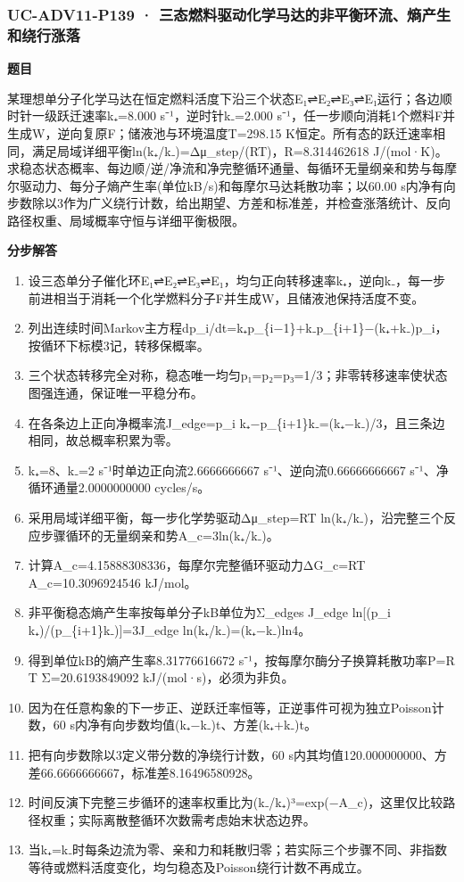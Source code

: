 \documentclass[UTF8,11pt,a4paper]{ctexart}
\begin{document}
\subsubsection*{UC-ADV11-P139 · 三态燃料驱动化学马达的非平衡环流、熵产生和绕行涨落}
\noindent\textbf{题目}\par
某理想单分子化学马达在恒定燃料活度下沿三个状态E₁⇌E₂⇌E₃⇌E₁运行；各边顺时针一级跃迁速率k₊=8.000 s⁻¹，逆时针k₋=2.000 s⁻¹，任一步顺向消耗1个燃料F并生成W，逆向复原F；储液池与环境温度T=298.15 K恒定。所有态的跃迁速率相同，满足局域详细平衡ln(k₊/k₋)=Δμ\_step/(RT)，R=8.314462618 J/(mol·K)。求稳态状态概率、每边顺/逆/净流和净完整循环通量、每循环无量纲亲和势与每摩尔驱动力、每分子熵产生率(单位kB/s)和每摩尔马达耗散功率；以60.00 s内净有向步数除以3作为广义绕行计数，给出期望、方差和标准差，并检查涨落统计、反向路径权重、局域概率守恒与详细平衡极限。\par
\medskip\noindent\textbf{分步解答}
\begin{enumerate}
\item 设三态单分子催化环E₁⇌E₂⇌E₃⇌E₁，均匀正向转移速率k₊，逆向k₋，每一步前进相当于消耗一个化学燃料分子F并生成W，且储液池保持活度不变。
\item 列出连续时间Markov主方程dp\_i/dt=k₊p\_\{i−1\}+k₋p\_\{i+1\}−(k₊+k₋)p\_i，按循环下标模3记，转移保概率。
\item 三个状态转移完全对称，稳态唯一均匀p₁=p₂=p₃=1/3；非零转移速率使状态图强连通，保证唯一平稳分布。
\item 在各条边上正向净概率流J\_edge=p\_i k₊−p\_\{i+1\}k₋=(k₊−k₋)/3，且三条边相同，故总概率积累为零。
\item k₊=8、k₋=2 s⁻¹时单边正向流2.6666666667 s⁻¹、逆向流0.66666666667 s⁻¹、净循环通量2.0000000000 cycles/s。
\item 采用局域详细平衡，每一步化学势驱动Δμ\_step=RT ln(k₊/k₋)，沿完整三个反应步骤循环的无量纲亲和势A\_c=3ln(k₊/k₋)。
\item 计算A\_c=4.15888308336，每摩尔完整循环驱动力ΔG\_c=RT A\_c=10.3096924546 kJ/mol。
\item 非平衡稳态熵产生率按每单分子kB单位为Σ\_edges J\_edge ln[(p\_i k₊)/(p\_\{i+1\}k₋)]=3J\_edge ln(k₊/k₋)=(k₊−k₋)ln4。
\item 得到单位kB的熵产生率8.31776616672 s⁻¹，按每摩尔酶分子换算耗散功率P=R T Σ=20.6193849092 kJ/(mol·s)，必须为非负。
\item 因为在任意构象的下一步正、逆跃迁率恒等，正逆事件可视为独立Poisson计数，60 s内净有向步数均值(k₊−k₋)t、方差(k₊+k₋)t。
\item 把有向步数除以3定义带分数的净绕行计数，60 s内其均值120.000000000、方差66.6666666667，标准差8.16496580928。
\item 时间反演下完整三步循环的速率权重比为(k₋/k₊)³=exp(−A\_c)，这里仅比较路径权重；实际离散整循环次数需考虑始末状态边界。
\item 当k₊=k₋时每条边流为零、亲和力和耗散归零；若实际三个步骤不同、非指数等待或燃料活度变化，均匀稳态及Poisson绕行计数不再成立。
\end{enumerate}
\end{document}
